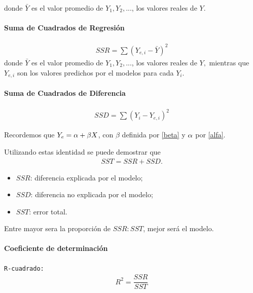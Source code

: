 donde $\bar{Y}$ es el valor promedio de $Y_{1}, Y_{2},...$, los valores reales de $Y.$


\paragraph{Suma de Cuadrados de Regresión}

\begin{align}
	SSR = \sum\left( Y_{e,i}-\bar{Y} \right)^{2}
\end{align}
donde $\bar{Y}$ es el valor promedio de $Y_{1}, Y_{2},...$, los valores reales de $Y,$ mientras que $Y_{e,i}$ son los valores predichos por el modelos para cada $Y_{i}.$


\paragraph{Suma de Cuadrados de Diferencia}
\begin{align}
	SSD = \sum\left( Y_{i}-Y_{e,i} \right)^{2}
\end{align}



Recordemos que $Y_{e}=\alpha + \beta X$, con $\beta$ definida por \eqref{beta} y $\alpha$ por \eqref{alfa}.



Utilizando estas identidad se puede demostrar que
\begin{align}
	SST = SSR +SSD.
\end{align}



\begin{itemize}
	\item $SSR$: diferencia explicada por el modelo;
	\item $SSD$: diferencia no explicada por el modelo;
	\item $SST$: error total.
\end{itemize}




\begin{observacion}
	Entre mayor sera la proporción de $SSR:SST$, mejor será el modelo.
\end{observacion}


\paragraph{Coeficiente de determinación}
\texttt{R-cuadrado: }
\begin{align}
	R^{2}=\dfrac{SSR}{SST}
\end{align}


